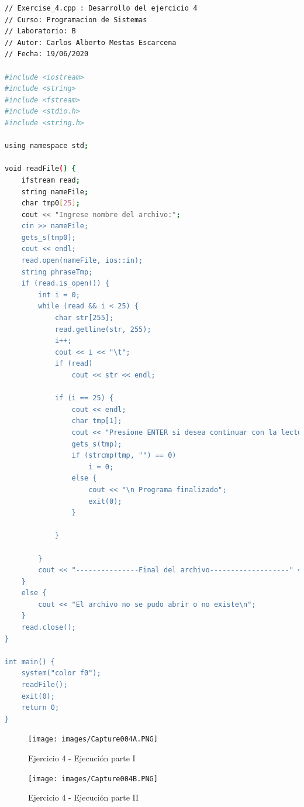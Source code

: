 \documentclass[12pt]{article}
\begin{document}
\begin{lstlisting}[language=bash,frame=single,style=CStyle]
// Exercise_4.cpp : Desarrollo del ejercicio 4
// Curso: Programacion de Sistemas
// Laboratorio: B
// Autor: Carlos Alberto Mestas Escarcena
// Fecha: 19/06/2020

#include <iostream>
#include <string>
#include <fstream>
#include <stdio.h>
#include <string.h>

using namespace std;

void readFile() {
    ifstream read;
    string nameFile;
    char tmp0[25];
    cout << "Ingrese nombre del archivo:";
    cin >> nameFile;
    gets_s(tmp0);
    cout << endl;
    read.open(nameFile, ios::in);
    string phraseTmp;
    if (read.is_open()) {
        int i = 0;
        while (read && i < 25) {
            char str[255];
            read.getline(str, 255);
            i++;
            cout << i << "\t";
            if (read) 
                cout << str << endl;
            
            if (i == 25) {
                cout << endl;
                char tmp[1];
                cout << "Presione ENTER si desea continuar con la lectura: \n";
                gets_s(tmp);
                if (strcmp(tmp, "") == 0)
                    i = 0;
                else {
                    cout << "\n Programa finalizado";
                    exit(0);
                }
                    
            }

        }
        cout << "---------------Final del archivo-------------------" << endl;
    }
    else {
        cout << "El archivo no se pudo abrir o no existe\n";
    }
    read.close();
}

int main() {
    system("color f0");
    readFile();
    exit(0);
    return 0;
}
\end{lstlisting}

\newpage
\clearpage

\begin{figure}[h]
    \centering
    \texttt{[image: images/Capture004A.PNG]}
    \caption{Ejercicio 4 - Ejecución parte I}
\end{figure}

\newpage
\clearpage

\begin{figure}[h]
    \centering
    \texttt{[image: images/Capture004B.PNG]}
    \caption{Ejercicio 4 - Ejecución parte II}
\end{figure}

\newpage
\clearpage
\end{document}
